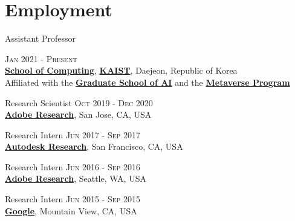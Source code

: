 \documentclass[letterpaper,10pt]{article} %
\newcommand{\blankline}{\quad\pagebreak[2]}
\begin{document}
\blankline



\section{Employment}

Assistant Professor \hfill{\textsc{Jan 2021 - Present}\\
\href{http://cs.kaist.ac.kr/}{\textbf{School of Computing}}, \href{http://www.kaist.ac.kr/}{\textbf{KAIST}}, Daejeon, Republic of Korea\\
Affiliated with the \href{https://gsai.kaist.ac.kr/}{\textbf{Graduate School of AI}} and the \href{https://meta.kaist.ac.kr/}{\textbf{Metaverse Program}}


Research Scientist \hfill{\textsc{Oct 2019 - Dec 2020}}\\
\href{https://research.adobe.com}{\textbf{Adobe Research}}, San Jose, CA, USA 


Research Intern \hfill{\textsc{Jun 2017 - Sep 2017}}\\
\href{https://www.autodeskresearch.com}{\textbf{Autodesk Research}}, San Francisco, CA, USA


Research Intern \hfill{\textsc{Jun 2016 - Sep 2016}}\\
\href{https://research.adobe.com/}{\textbf{Adobe Research}}, Seattle, WA, USA


Research Intern \hfill{\textsc{Jun 2015 - Sep 2015}}\\
\href{http://www.google.com}{\textbf{Google}}, Mountain View, CA, USA

}
\end{document}
